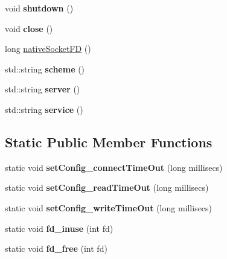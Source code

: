 \begin{DoxyCompactItemize}
\item 
\mbox{\label{class_t_c_p_connection_afdd912efe436e41d99a60ef1bb16ec73}} 
void {\bfseries shutdown} ()
\item 
\mbox{\label{class_t_c_p_connection_ab9d37f9ec45ee1c1bfb4164aed8b7135}} 
void {\bfseries close} ()
\item 
long \hyperlink{class_t_c_p_connection_a76fd32d49d1875e8e4a0f9f503a92bcd}{native\+Socket\+FD} ()
\item 
\mbox{\label{class_t_c_p_connection_ac270233abe1610585bcaa86e654cf6ad}} 
std\+::string {\bfseries scheme} ()
\item 
\mbox{\label{class_t_c_p_connection_a3dc68d736ab41b8550696f1bdedaf40a}} 
std\+::string {\bfseries server} ()
\item 
\mbox{\label{class_t_c_p_connection_ac8ed90aa1225fe1f534e736a438ac8bd}} 
std\+::string {\bfseries service} ()
\end{DoxyCompactItemize}
\subsection*{Static Public Member Functions}
\begin{DoxyCompactItemize}
\item 
\mbox{\label{class_t_c_p_connection_a55d72a606e2ec9be8e145606001c9790}} 
static void {\bfseries set\+Config\+\_\+connect\+Time\+Out} (long millisecs)
\item 
\mbox{\label{class_t_c_p_connection_acbf6e8d1866906ce7b1a269c0df35f20}} 
static void {\bfseries set\+Config\+\_\+read\+Time\+Out} (long millisecs)
\item 
\mbox{\label{class_t_c_p_connection_a1a53971c6eeadf5dd1be0aa45b654694}} 
static void {\bfseries set\+Config\+\_\+write\+Time\+Out} (long millisecs)
\item 
\mbox{\label{class_t_c_p_connection_a22bdfdfecfdf97f4b8024e28e2ed6eb0}} 
static void {\bfseries fd\+\_\+inuse} (int fd)
\item 
\mbox{\label{class_t_c_p_connection_ac0077ddd447c155402fa00348ec8635d}} 
static void {\bfseries fd\+\_\+free} (int fd)
\end{DoxyCompactItemize}
